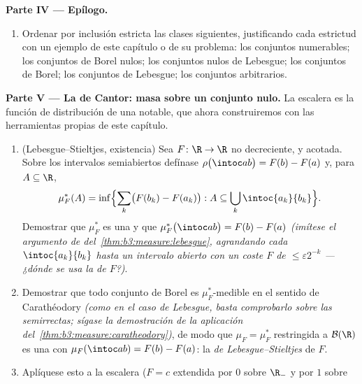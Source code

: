 \begin{problem}
\medskip
\noindent\textbf{Parte IV --- Epílogo.}
\begin{enumerate}[resume]
  \item Ordenar por inclusión estricta las clases siguientes,
  justificando cada estrictud con un ejemplo de este capítulo o de su
  problema: los conjuntos numerables; los conjuntos de Borel nulos; los
  conjuntos nulos de Lebesgue; los conjuntos de Borel; los conjuntos de
  Lebesgue; los conjuntos arbitrarios.
\end{enumerate}

\medskip
\noindent\textbf{Parte V --- La 
de Cantor: masa sobre un conjunto nulo.} La escalera es la función de
distribución de una  notable, que
ahora construiremos con las herramientas propias de este capítulo.
\begin{enumerate}[resume]
  \item (Lebesgue--Stieltjes, existencia) Sea $F\colon\R\to\R$ no
  decreciente,  y acotada.
  Sobre los intervalos semiabiertos defínase
  $\rho\bigl(\intoc ab\bigr) = F(b) -
        F(a)$ y, para $A \subseteq \R$,
        \[
        \mu_F^*(A) = \inf\Bigl\{\sum_k\bigl(F(b_k) -
        F(a_k)\bigr) : A \subseteq
        \bigcup_k\intoc{a_k}{b_k}\Bigr\} .
        \]
        Demostrar que $\mu_F^*$ es una
         y que
        $\mu_F^*\bigl(\intoc ab\bigr) = F(b) - F(a)$
        \emph{(imítese el argumento de 
        del~\cref{thm:b3:measure:lebesgue}, agrandando cada
        $\intoc{a_k}{b_k}$ hasta un intervalo abierto con un coste $F$
        de $\leq \varepsilon2^{-k}$ --- ¿dónde se usa la
         de $F$?)}.
        \item Demostrar que todo conjunto de Borel es $\mu_F^*$-medible
        en el sentido de Carathéodory \emph{(como en el caso de
        Lebesgue, basta comprobarlo sobre las semirrectas; sígase la
        demostración de la aplicación
        del~\cref{thm:b3:measure:caratheodory})}, de modo que
        $\mu_F = \mu_F^*$ restringida a $\mathcal B(\R)$ es una
         con
        $\mu_F(\intoc ab) = F(b) - F(a)$: la
        \emph{ de
        Lebesgue--Stieltjes} de $F$. \item Aplíquese esto a la escalera
        ($F = c$ extendida por $0$ sobre $\R_-$ y por $1$ sobre

\end{enumerate}
\end{problem}
